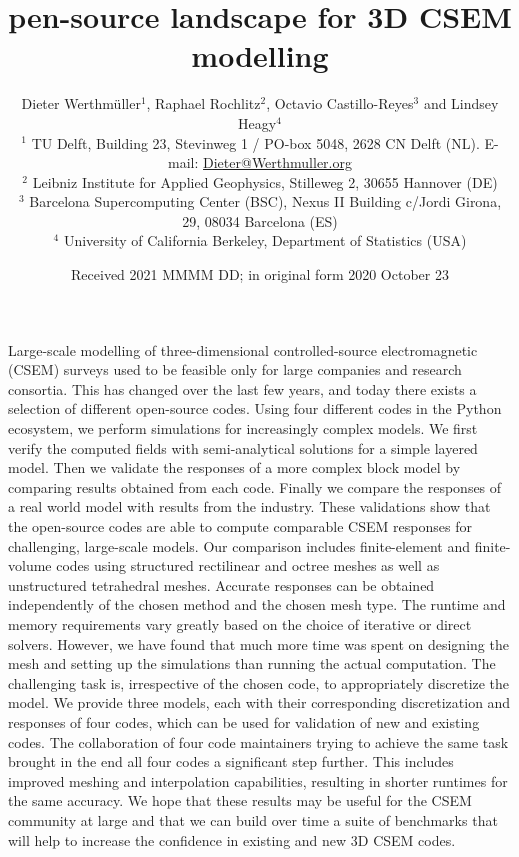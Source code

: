 \documentclass[extra, camera,%
]{gji}
\title[3D CSEM Open-Source Landscape]{\replaced{Towards an o}{O}pen-source landscape for 3D CSEM modelling}
\author[D. Werthmüller \emph{et al.}]
  {\Large Dieter Werthmüller$^1$, %
   Raphael Rochlitz$^2$,          %
   Octavio Castillo-Reyes$^3$ and %
   Lindsey Heagy$^4$\\            %
   \footnotesize
  $^1$ TU Delft, Building 23, Stevinweg 1 / PO-box 5048, 2628 CN Delft (NL).
  E-mail: \href{mailto:Dieter@Werthmuller.org}{Dieter@Werthmuller.org}\\[-.3em]
   \footnotesize
  $^2$ Leibniz Institute for Applied Geophysics, Stilleweg 2, 30655 Hannover (DE)\\[-.3em]
   \footnotesize
   $^3$ Barcelona Supercomputing Center (BSC), Nexus II Building c/Jordi Girona, 29, 08034 Barcelona (ES)\\[-.3em]
   \footnotesize
  $^4$ University of California Berkeley, Department of Statistics (USA)
  }
\date{Received 2021 MMMM DD; in original form 2020 October 23}
\makeatletter
\let\zz@tabular\@tabular
\let\zzendtabular\endtabular
\let\zz@xtabularcr\@xtabularcr
\let\zz@tabclassz\@tabclassz
\let\zz@tabclassiv \@tabclassiv
\let\zz@tabarray\@tabarray
\makeatother
\begin{document}
\label{firstpage}

{\makeatletter
\let\@tabular\zz@tabular
\let\endtabular\zzendtabular
\let\@xtabularcr\zz@xtabularcr
\let\@tabclassz\zz@tabclassz
\let\@tabclassiv \zz@tabclassiv 
\let\@tabarray\zz@tabarray
\maketitle
}

\begin{summary}
Large-scale modelling of three-dimensional controlled-source electromagnetic (CSEM) surveys used to be feasible only for large companies and research consortia. This has changed over the last few years, and today there exists a selection of different open-source codes. Using four different codes in the Python ecosystem, we perform simulations for increasingly complex models. We first verify the computed fields with semi-analytical solutions for a simple layered model. Then we validate the responses of a more complex block model by comparing results obtained from each code. Finally we compare the responses of a real world model with results from the industry. These validations show that the open-source codes are able to compute comparable CSEM responses for challenging, large-scale models. Our comparison includes finite-element and finite-volume codes using structured rectilinear and octree meshes as well as unstructured tetrahedral meshes. Accurate responses can be obtained independently of the chosen method and the chosen mesh type. The runtime and memory requirements vary greatly based on the choice of iterative or direct solvers. However, we have found that much more time was spent on designing the mesh and setting up the simulations than running the actual computation. The challenging task is, irrespective of the chosen code, to appropriately discretize the model. We provide three models, each with their corresponding discretization and responses of four codes, which can be used for validation of new and existing codes. The collaboration of four code maintainers trying to achieve the same task brought in the end all four codes a significant step further. This includes improved meshing and interpolation capabilities, resulting in shorter runtimes for the same accuracy. We hope that these results may be useful for the CSEM community at large and that we can build over time a suite of benchmarks that will help to increase the confidence in existing and new 3D CSEM codes.
\end{summary}
\end{document}
